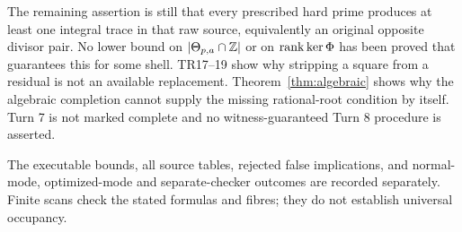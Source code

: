 The remaining assertion is still that every prescribed hard prime produces
at least one integral trace in that raw source, equivalently an original
opposite divisor pair. No lower bound on $|\Theta_{p,a}\cap\mathbb Z|$ or on
$\operatorname{rank}\ker\Phi$ has been proved that guarantees this for some shell. TR17--19
show why stripping a square from a residual is not an available replacement.
Theorem~\ref{thm:algebraic} shows why the algebraic completion cannot supply the
missing rational-root condition by itself. Turn 7 is not marked complete and
no witness-guaranteed Turn 8 procedure is asserted.

The executable bounds, all source tables, rejected false implications, and
normal-mode, optimized-mode and separate-checker outcomes are recorded separately. Finite scans
check the stated formulas and fibres; they do not establish universal occupancy.
